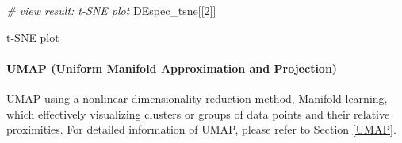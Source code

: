 \documentclass[]{article}
\newcommand{\hlnum}[1]{\textcolor[rgb]{0.816,0.125,0.439}{#1}}%
\newcommand{\hlcom}[1]{\textcolor[rgb]{0.502,0.502,0.502}{\textit{#1}}}%
\newcommand{\hlstd}[1]{\textcolor[rgb]{0.251,0.251,0.251}{#1}}%
\newenvironment{Shaded}{\begin{myshaded}}{\end{myshaded}}
\newcommand{\DecValTok}[1]{\hlnum{#1}}
\newcommand{\CommentTok}[1]{\hlcom{#1}}
\newcommand{\NormalTok}[1]{\hlstd{#1}}
\begin{document}
\begin{Shaded}
\begin{Highlighting}[]
\CommentTok{# view result: t-SNE plot}
\NormalTok{DEspec_tsne[[}\DecValTok{2}\NormalTok{]]     }
\end{Highlighting}
\end{Shaded}

\label{fig:unnamed-chunk-24}t-SNE plot

\hypertarget{umap-uniform-manifold-approximation-and-projection}{%
\paragraph{UMAP (Uniform Manifold Approximation and Projection)}\label{umap-uniform-manifold-approximation-and-projection}}

UMAP using a nonlinear dimensionality reduction method, Manifold learning, which effectively visualizing clusters or groups of data points and their relative proximities. For detailed information of UMAP, please refer to Section \ref{UMAP}.
\end{document}
